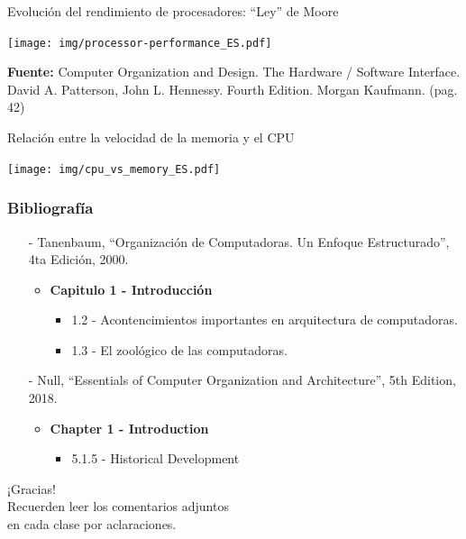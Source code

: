\documentclass[aspectratio=169]{beamer}
\begin{document}
\begin{frame}[fragile,t]{Evolución del rendimiento de procesadores: ``Ley'' de Moore}
    \vspace{-0.3cm}
    \begin{center}
    \texttt{[image: img/processor-performance\_ES.pdf]}
    \end{center}
    \vspace{-0.5cm}
    \tiny \textbf{Fuente:} Computer Organization and Design. The Hardware / Software Interface. David A. Patterson, John L. Hennessy. Fourth Edition. Morgan Kaufmann. (pag. 42)
\end{frame}

\begin{frame}[fragile,t]{Relación entre la velocidad de la memoria y el CPU}
    \begin{center}
    \texttt{[image: img/cpu\_vs\_memory\_ES.pdf]}
    \end{center}
\end{frame}

\begin{frame}[fragile]
    \frametitle{Bibliografía}
    \begin{itemize}
     \setlength\itemsep{0.5cm}
    \item[-] \small Tanenbaum, “Organización de Computadoras. Un Enfoque Estructurado”, 4ta Edición, 2000.\\
    \begin{itemize}
     \item \textbf{Capitulo 1 - Introducción}\\
     \begin{itemize}
      \item 1.2 - Acontencimientos importantes en arquitectura de computadoras.
      \item 1.3 - El zoológico de las computadoras.
     \end{itemize}
    \end{itemize}
    \item[-] \small Null, “Essentials of Computer Organization and Architecture”, 5th Edition, 2018.\\
    \begin{itemize}
    \item \textbf{Chapter 1 - Introduction}
     \begin{itemize}
        \item 5.1.5 - Historical Development
     \end{itemize}
    \end{itemize}
    \end{itemize}
\end{frame}

\begin{frame}[plain]
    \begin{center}
    \vspace{2cm}
    \huge ¡Gracias!\\
    \vspace{2cm}
    \normalsize Recuerden leer los comentarios adjuntos\\ en cada clase por aclaraciones.
    \end{center}
\end{frame}
\end{document}
